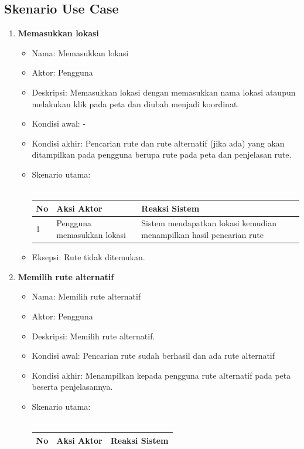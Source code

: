\subsection{Skenario Use Case}
\begin{enumerate}
	\item \textbf{Memasukkan lokasi}
	\begin{itemize}
			\item Nama: Memasukkan lokasi
			\item Aktor: Pengguna
			\item Deskripsi: Memasukkan lokasi dengan memasukkan nama lokasi ataupun melakukan klik pada peta dan diubah menjadi koordinat.
			\item Kondisi awal: -
			\item Kondisi akhir: Pencarian rute dan rute alternatif (jika ada) yang akan ditampilkan pada pengguna berupa rute pada peta dan penjelasan rute.
			\item Skenario utama: \\ \\
				\begin{tabular}{|p{0.5cm} |p{6cm}| p{6cm}|}
						\hline
							No 	& Aksi Aktor & Reaksi Sistem \\ \hline
							1 	& Pengguna memasukkan lokasi 	&	Sistem mendapatkan lokasi kemudian menampilkan hasil pencarian rute \\ \hline 
						\end{tabular} 
			\item Eksepsi: Rute tidak ditemukan.
		\end{itemize}
	\item \textbf{Memilih rute alternatif}
	\begin{itemize}
			\item Nama: Memilih rute alternatif
			\item Aktor: Pengguna
			\item Deskripsi: Memilih rute alternatif.
			\item Kondisi awal: Pencarian rute sudah berhasil dan ada rute alternatif
			\item Kondisi akhir: Menampilkan kepada pengguna rute alternatif pada peta beserta penjelasannya.
			\item Skenario utama: \\ \\
				\begin{tabular}{|p{0.5cm} |p{6cm}| p{6cm}|}
						\hline
							No 	& Aksi Aktor & Reaksi Sistem \\ \hline

\end{tabular}
\end{itemize}
\end{enumerate}
